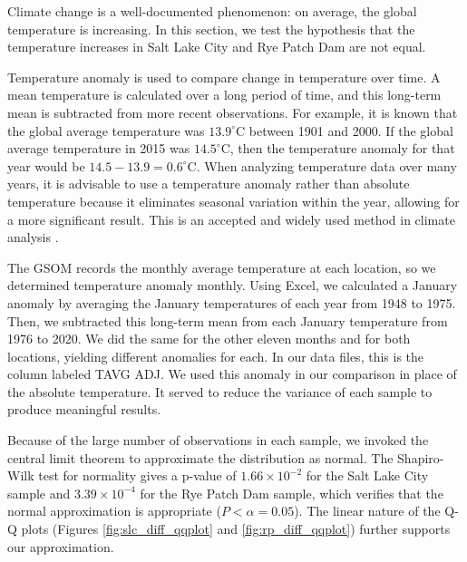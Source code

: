 Climate change is a well-documented phenomenon: on average, the global temperature is increasing. In this section, we test the hypothesis that the temperature increases in Salt Lake City and Rye Patch Dam are not equal.

Temperature anomaly is used to compare change in temperature over time. A mean temperature is calculated over a long period of time, and this long-term mean is subtracted from more recent observations. For example, it is known that the global average temperature was $13.9^{\circ}$C between 1901 and 2000. If the global average temperature in 2015 was $14.5^{\circ}$C, then the temperature anomaly for that year would be $14.5 - 13.9 = 0.6^{\circ}$C. When analyzing temperature data over many years, it is advisable to use a temperature anomaly rather than absolute temperature because it eliminates seasonal variation within the year, allowing for a more significant result. This is an accepted and widely used method in climate analysis \cite{temp_anomaly}.

The GSOM records the monthly average temperature at each location, so we determined temperature anomaly monthly. Using Excel, we calculated a January anomaly by averaging the January temperatures of each year from 1948 to 1975. Then, we subtracted this long-term mean from each January temperature from 1976 to 2020. We did the same for the other eleven months and for both locations, yielding different anomalies for each. In our data files, this is the column labeled TAVG ADJ. We used this anomaly in our comparison in place of the absolute temperature. It served to reduce the variance of each sample to produce meaningful results.

Because of the large number of observations in each sample, we invoked the central limit theorem to approximate the distribution as normal. The Shapiro-Wilk test for normality gives a p-value of $1.66\times 10^{-2}$ for the Salt Lake City sample and $3.39\times 10^{-4}$ for the Rye Patch Dam sample, which verifies that the normal approximation is appropriate ($P < \alpha = 0.05$). The linear nature of the Q-Q plots (Figures \ref{fig:slc_diff_qqplot} and \ref{fig:rp_diff_qqplot}) further supports our approximation.

